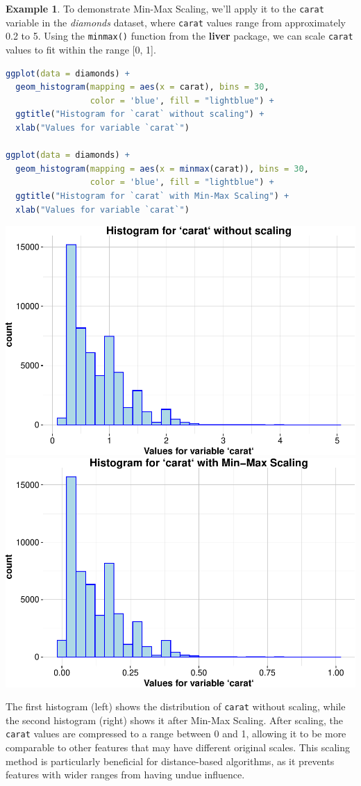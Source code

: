 \documentclass[
]{book}
\newcommand{\passthrough}[1]{#1}
\theoremstyle{definition}
\theoremstyle{definition}
\newtheorem{example}{Example}[chapter]
\theoremstyle{definition}
\theoremstyle{definition}
\theoremstyle{remark}
\begin{document}
\begin{example}
\protect\hypertarget{exm:ex-min-max}{}\label{exm:ex-min-max}To demonstrate Min-Max Scaling, we'll apply it to the \passthrough{\lstinline!carat!} variable in the \emph{diamonds} dataset, where \passthrough{\lstinline!carat!} values range from approximately 0.2 to 5. Using the \passthrough{\lstinline!minmax()!} function from the \textbf{liver} package, we can scale \passthrough{\lstinline!carat!} values to fit within the range {[}0, 1{]}.

\begin{lstlisting}[language=R]
ggplot(data = diamonds) +
  geom_histogram(mapping = aes(x = carat), bins = 30,
                 color = 'blue', fill = "lightblue") +
  ggtitle("Histogram for `carat` without scaling") + 
  xlab("Values for variable `carat`")

ggplot(data = diamonds) +
  geom_histogram(mapping = aes(x = minmax(carat)), bins = 30,
                 color = 'blue', fill = "lightblue") +
  ggtitle("Histogram for `carat` with Min-Max Scaling") + 
  xlab("Values for variable `carat`")
\end{lstlisting}

\includegraphics[width=0.5\linewidth]{data-preparation_files/figure-latex/unnamed-chunk-10-1} \includegraphics[width=0.5\linewidth]{data-preparation_files/figure-latex/unnamed-chunk-10-2}

The first histogram (left) shows the distribution of \passthrough{\lstinline!carat!} without scaling, while the second histogram (right) shows it after Min-Max Scaling. After scaling, the \passthrough{\lstinline!carat!} values are compressed to a range between 0 and 1, allowing it to be more comparable to other features that may have different original scales. This scaling method is particularly beneficial for distance-based algorithms, as it prevents features with wider ranges from having undue influence.
\end{example}
\end{document}
